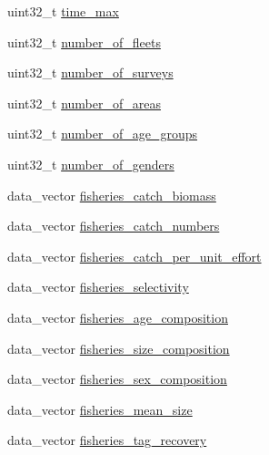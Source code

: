 \begin{DoxyCompactItemize}
\item 
uint32\+\_\+t \hyperlink{classmas_1_1_observation_a54f6b6af3aab188189e52432c42c20a0}{time\+\_\+max}
\item 
uint32\+\_\+t \hyperlink{classmas_1_1_observation_a6843bf35d78a6405a41afc9e4a1334e6}{number\+\_\+of\+\_\+fleets}
\item 
uint32\+\_\+t \hyperlink{classmas_1_1_observation_a6e3ce52d5a415a29b901ba4c8007bbc5}{number\+\_\+of\+\_\+surveys}
\item 
uint32\+\_\+t \hyperlink{classmas_1_1_observation_abe10a9fcce4305cdc7840b8d25b87c8e}{number\+\_\+of\+\_\+areas}
\item 
uint32\+\_\+t \hyperlink{classmas_1_1_observation_a56d2181956836fe2e3d7d39d17795929}{number\+\_\+of\+\_\+age\+\_\+groups}
\item 
uint32\+\_\+t \hyperlink{classmas_1_1_observation_a481d3e475a2ff592156ea4b180f91876}{number\+\_\+of\+\_\+genders}
\item 
data\+\_\+vector \hyperlink{classmas_1_1_observation_ace6a30e80477280a5f6f18b79761fb93}{fisheries\+\_\+catch\+\_\+biomass}
\item 
data\+\_\+vector \hyperlink{classmas_1_1_observation_a5ce77924f9fbb0e384ea94d4a0fa224c}{fisheries\+\_\+catch\+\_\+numbers}
\item 
data\+\_\+vector \hyperlink{classmas_1_1_observation_a0aca199b27283dc8d0902dd42e2babc0}{fisheries\+\_\+catch\+\_\+per\+\_\+unit\+\_\+effort}
\item 
data\+\_\+vector \hyperlink{classmas_1_1_observation_af044bb2c45e00485bd98f70e6d11f470}{fisheries\+\_\+selectivity}
\item 
data\+\_\+vector \hyperlink{classmas_1_1_observation_a58d075ce10fa51dbf4f93ddb3ca7920e}{fisheries\+\_\+age\+\_\+composition}
\item 
data\+\_\+vector \hyperlink{classmas_1_1_observation_aac8ee77d201137577d47e04f56caf02a}{fisheries\+\_\+size\+\_\+composition}
\item 
data\+\_\+vector \hyperlink{classmas_1_1_observation_ae7b1b9a34feb637eee59ae13592b2763}{fisheries\+\_\+sex\+\_\+composition}
\item 
data\+\_\+vector \hyperlink{classmas_1_1_observation_a5606497a42c83ac55f64f48021c8fa3e}{fisheries\+\_\+mean\+\_\+size}
\item 
data\+\_\+vector \hyperlink{classmas_1_1_observation_a853ad19a7c4de86a927c311e51d7e484}{fisheries\+\_\+tag\+\_\+recovery}
\item 

\end{DoxyCompactItemize}

